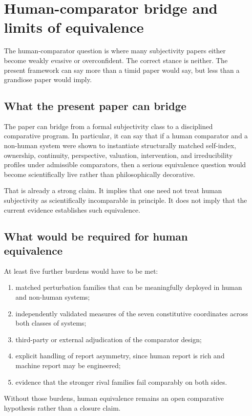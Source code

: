 \documentclass[11pt,a4paper]{article}
\theoremstyle{definition}
\begin{document}
\section{Human-comparator bridge and limits of equivalence}
The human-comparator question is where many subjectivity papers either become weakly evasive or overconfident. The correct stance is neither. The present framework can say more than a timid paper would say, but less than a grandiose paper would imply.

\subsection{What the present paper can bridge}
The paper can bridge from a formal subjectivity class to a disciplined comparative program. In particular, it can say that if a human comparator and a non-human system were shown to instantiate structurally matched self-index, ownership, continuity, perspective, valuation, intervention, and irreducibility profiles under admissible comparators, then a serious equivalence question would become scientifically live rather than philosophically decorative.

That is already a strong claim. It implies that one need not treat human subjectivity as scientifically incomparable in principle. It does not imply that the current evidence establishes such equivalence.

\subsection{What would be required for human equivalence}
At least five further burdens would have to be met:
\begin{enumerate}[leftmargin=1.5em]
\item matched perturbation families that can be meaningfully deployed in human and non-human systems;
\item independently validated measures of the seven constitutive coordinates across both classes of systems;
\item third-party or external adjudication of the comparator design;
\item explicit handling of report asymmetry, since human report is rich and machine report may be engineered;
\item evidence that the stronger rival families fail comparably on both sides.
\end{enumerate}
Without those burdens, human equivalence remains an open comparative hypothesis rather than a closure claim.
\end{document}
